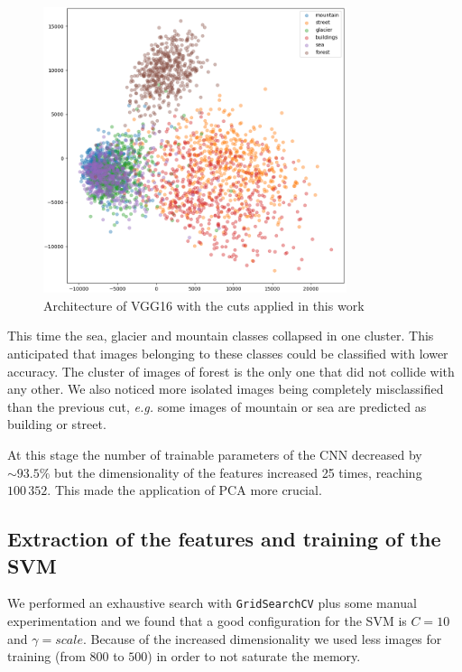 \documentclass[compsoc]{IEEEtran}
\begin{document}
\begin{figure}[ht!]
\centering                                                                        
\includegraphics[width=3.5in]{../images/pca-2.png}
\captionsetup{justification=centering}                                                                                         
\caption{Architecture of VGG16 with the cuts applied in this work}
\label{fig:pca2}                                                                                                                               
\end{figure}

This time the sea, glacier and mountain classes collapsed in one cluster. This anticipated that images belonging to these classes could be classified with lower accuracy.
The cluster of images of forest is the only one that did not collide with any other.
We also noticed more isolated images being completely misclassified than the previous cut, \emph{e.g.} some images of mountain or sea are predicted as building or street.
\par



At this stage the number of trainable parameters of the CNN decreased by ${\sim93.5\%}$ but the dimensionality of the features increased 25 times, reaching $100\,352$. This made the application of PCA more crucial. 


\subsection{Extraction of the features and training of the SVM}
We performed an exhaustive search with \texttt{GridSearchCV} plus some manual experimentation and we found that a good configuration for the SVM is $C=10$ and $\gamma=scale$. Because of the increased dimensionality we used less images for training (from $800$ to $500$) in order to not saturate the memory. 	\par
\end{document}

